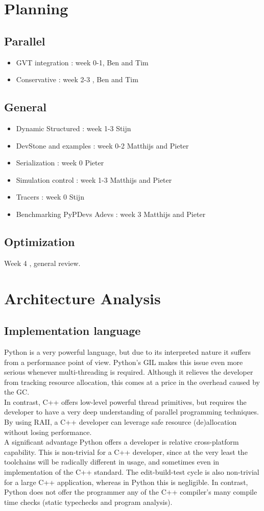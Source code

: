 \documentclass[8pt,a4paper]{report}
\begin{document}
\chapter{Planning}
\section{Parallel}
\begin {itemize}
\item GVT integration : week 0-1, Ben and Tim
\item Conservative : week 2-3 , Ben and Tim
\end {itemize}
\section{General}
\begin {itemize}
\item Dynamic Structured : week 1-3 Stijn
\item DevStone and examples : week 0-2 Matthijs and Pieter
\item Serialization : week 0 Pieter
\item Simulation control : week 1-3 Matthijs and Pieter  
\item Tracers : week 0 Stijn
\item Benchmarking PyPDevs Adevs : week 3 Matthijs and Pieter
\end {itemize}
\section{Optimization}
Week 4 , general review.

\chapter{Architecture Analysis}
\section{Implementation language}
Python is a very powerful language, but due to its interpreted nature it suffers from a performance point of view. Python's GIL \cite{gil} makes this issue even more serious whenever multi-threading is required. Although it relieves the developer from tracking resource allocation, this comes at a price in the overhead caused by the GC. \\
In contrast, C++ offers low-level powerful thread primitives, but requires the developer to have a very deep understanding of parallel programming techniques. By using RAII, a C++ developer can leverage safe resource (de)allocation without losing performance.\\
A significant advantage Python offers a developer is relative cross-platform capability. This is non-trivial for a C++ developer, since at the very least the toolchains will be radically different in usage, and sometimes even in implementation of the C++ standard. The edit-build-test cycle is also non-trivial for a large C++ application, whereas in Python this is negligible. In contrast, Python does not offer the programmer any of the C++ compiler's many compile time checks (static typechecks and program analysis).
\end{document}
